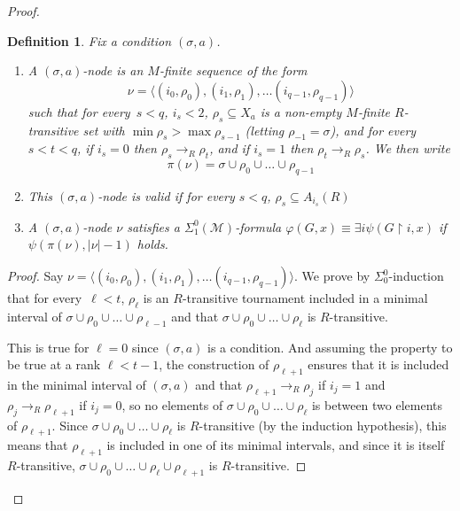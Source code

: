 \documentclass{article}
\numberwithin{theorem}{section}
\newtheorem{lemma}[theorem]{Lemma}
\newtheorem{definition}[theorem]{Definition}
\newcommand{\M}{\mathcal{M}}
\newcommand{\uh}[0]{{\upharpoonright}}
\begin{document}
\begin{proof}
\begin{definition}
Fix a condition $(\sigma, a)$.
\begin{enumerate}
    \item[(1)] A \emph{$(\sigma, a)$-node} is an $M$-finite sequence of the form
$$\nu = \langle (i_0, \rho_0), (i_1, \rho_1), \dots (i_{q-1}, \rho_{q-1}) \rangle$$ such that for every~$s < q$, $i_s < 2$, $\rho_s \subseteq X_a$ is a non-empty $M$-finite $R$-transitive set with $\min \rho_s > \max \rho_{s-1}$ (letting $\rho_{-1} = \sigma$), and for every~$s < t < q$, if $i_s = 0$ then $\rho_s \to_R \rho_t$, and if $i_s = 1$ then $\rho_t \to_R \rho_s$.
We then write $$\pi(\nu) = \sigma \cup \rho_0 \cup \dots \cup \rho_{q-1}$$
    \item[(2)] This $(\sigma, a)$-node is \emph{valid} if for every $s < q$, $\rho_s \subseteq A_{i_s}(R)$
    \item[(3)] A $(\sigma, a)$-node $\nu$ \emph{satisfies} a $\Sigma^0_1(\M)$-formula $\varphi(G, x) \equiv \exists i \psi(G \uh i, x)$  if $\psi(\pi(\nu), |\nu|-1)$ holds.
\end{enumerate}
\end{definition}

\begin{proof}
Say $\nu = \langle (i_0, \rho_0), (i_1, \rho_1), \dots (i_{q-1}, \rho_{q-1}) \rangle$.
We prove by $\Sigma^0_0$-induction that for every~$\ell < t$, $\rho_\ell$ is an $R$-transitive tournament included in a minimal interval of $\sigma \cup \rho_0 \cup \dots \cup \rho_{\ell-1}$ and that $\sigma \cup \rho_0 \cup \dots \cup \rho_{\ell}$ is $R$-transitive.

This is true for $\ell = 0$ since $(\sigma, a)$ is a condition. And assuming the property to be true at a rank $\ell < t-1$, the construction of $\rho_{\ell +1}$ ensures that it is included in the minimal interval of $(\sigma,a)$ and that $\rho_{\ell + 1} \to_R \rho_{j}$ if $i_j = 1$ and $\rho_j \to_R \rho_{\ell + 1}$ if $i_j = 0$, so no elements of $\sigma \cup \rho_0 \cup \dots \cup \rho_{\ell}$ is between two elements of $\rho_{\ell+1}$. Since $\sigma \cup \rho_0 \cup \dots \cup \rho_{\ell}$ is $R$-transitive (by the induction hypothesis), this means that $\rho_{\ell +1}$ is included in one of its minimal intervals, and since it is itself $R$-transitive, $\sigma \cup \rho_0 \cup \dots \cup \rho_{\ell} \cup \rho_{\ell +1}$ is $R$-transitive.
\end{proof}


\end{proof}
\end{document}
